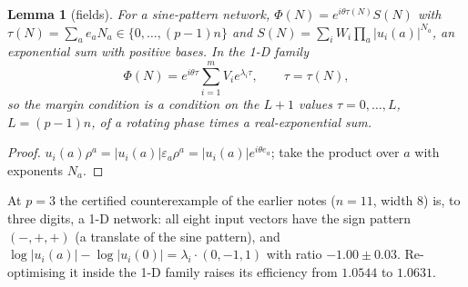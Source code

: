 \documentclass[11pt]{article}
\newtheorem{lemma}[theorem]{Lemma}
\theoremstyle{definition}
\begin{document}
\begin{lemma}[fields]\label{lem:field}
For a sine-pattern network, $\Phi(N)=e^{i\theta\tau(N)}S(N)$ with $\tau(N)=\sum_ae_aN_a\in\{0,\dots,(p-1)n\}$ and
$S(N)=\sum_iW_i\prod_a|u_i(a)|^{N_a}$, an exponential sum with positive bases.  In the 1-D family
\[\Phi(N)=e^{i\theta\tau}\sum_{i=1}^mV_ie^{\lambda_i\tau},\qquad\tau=\tau(N),\]
so the margin condition is a condition on the $L+1$ values $\tau=0,\dots,L$, $L=(p-1)n$, of a rotating phase times a
real-exponential sum.
\end{lemma}
\begin{proof}
$u_i(a)\rho^a=|u_i(a)|\varepsilon_a\rho^a=|u_i(a)|e^{i\theta e_a}$; take the product over $a$ with exponents $N_a$.
\end{proof}

At $p=3$ the certified counterexample of the earlier notes ($n=11$, width $8$) is, to three digits, a 1-D network: all
eight input vectors have the sign pattern $(-,+,+)$ (a translate of the sine pattern), and
$\log|u_i(a)|-\log|u_i(0)|=\lambda_i\cdot(0,-1,1)$ with ratio $-1.00\pm0.03$.  Re-optimising it inside the 1-D family
raises its efficiency from $1.0544$ to $1.0631$.
\end{document}
